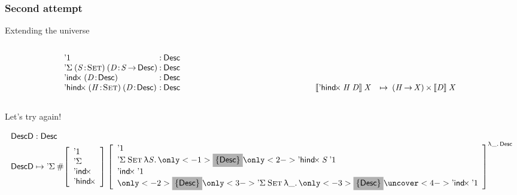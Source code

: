 \documentclass{beamer}
\begin{document}
\begin{frame}

\frametitle{Second attempt}

\begin{block}{Extending the universe}
\vspace*{-0.5cm}
\begin{columns}
  \begin{column}{5cm}
\[
\begin{array}{@{}l@{\::\:}l}
\DUnit   & \Desc \\
\DSigma{(\Bhab{\V{S}}{\Set})}{(\Bhab{\V{D}}{\V{S} \To \Desc})} 
         & \Desc \\
\DIndx{(\Bhab{\V{D}}{\Desc})} 
         & \Desc \\
\DHindx{(\Bhab{\V{H}}{\Set})}{(\Bhab{\V{D}}{\Desc})} 
         & \Desc
\end{array}
\]
  \end{column}
  \begin{column}{6cm}
\[
\begin{array}{@{}ll}     
 & \\
 & \\
 & \\
\descop{\DHindx{\V{H}}{\V{D}}}{\V{X}}  & \mapsto\:
     \TIMES{(\V{H} \To \V{X})}{\descop{\V{D}}{\V{X}}} 
\end{array}
\]
  \end{column}
\end{columns}

\end{block}

\begin{block}{Let's try again!}

\[\stk{
\DescD : \Desc \\
\DescD \mapsto 
            \DSigma{\EnumT{\sqr{\begin{array}{l}
                                     \DUnit\\
                                     \SYMBDSigma\\
                                     \SYMBDIndx \\
                                     \SYMBDHindx
                                \end{array}}}}
                   {\gsqr{\begin{array}{l}
                            \DUnit\\
                            \DSigma{\Set}{\LAM{\V{S}}{\only<-1>{\SHEDARG{\Desc}}
                                                      \only<2->{\DHindx{\V{S}}{\DUnit}}}}\\
                            \DIndx{\DUnit}\\
                            \only<-2>{\SHEDARG{\Desc}}
                            \only<3->{\DSigma{\Set}{\LAM{\_} \only<-3>{\SHEDARG{\Desc}}
                                                             \uncover<4->{\DIndx{\DUnit}}}}
                          \end{array}}{\LAM{\_} \Desc}} \\
}\]


\end{block}
\end{frame}
\end{document}

